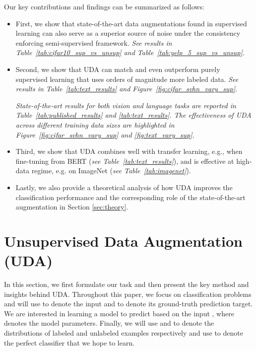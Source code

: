 \documentclass{article}
\def\name{UDA\xspace}
\begin{document}
Our key contributions and findings can be summarized as follows:
\begin{itemize}[leftmargin=*,itemsep=0em,topsep=0em]
    \item First, we show that state-of-the-art data augmentations found in supervised learning can also serve as a superior source of noise under the consistency enforcing semi-supervised framework. {\it See results in Table~\ref{tab:cifar10_sup_vs_unsup} and Table~\ref{tab:yelp_5_sup_vs_unsup}.}
    \item Second, we show that UDA can match and even outperform purely supervised learning that uses orders of magnitude more labeled data. {\it See results in Table~\ref{tab:text_results} and Figure~\ref{fig:cifar_svhn_vary_sup}.}
    
    {\it State-of-the-art results for both vision and language tasks are reported in Table~\ref{tab:published_results} and \ref{tab:text_results}. The effectiveness of UDA across different training data sizes are highlighted in Figure~\ref{fig:cifar_svhn_vary_sup} and \ref{fig:text_vary_sup}.}
    \item Third, we show that UDA combines well with transfer learning, e.g., when fine-tuning from BERT ({\it see Table~\ref{tab:text_results}}), and is effective at high-data regime, e.g. on ImageNet ({\it see Table~\ref{tab:imagenet}}).
    \item Lastly, we also provide a theoretical analysis of how \name improves the classification performance and the corresponding role of the state-of-the-art augmentation in Section \ref{sec:theory}.
\end{itemize}
 \vspace{-0.5em}
\section{Unsupervised Data Augmentation (UDA)}
\label{sec:method}
\vspace{-0.5em}
In this section, we first formulate our task and then present the key method and insights behind \name.
Throughout this paper, we focus on classification problems and will use  to denote the input and  to denote its ground-truth prediction target. We are interested in learning a model  to predict  based on the input , where  denotes the model parameters.
Finally, we will use  and  to denote the distributions of labeled and unlabeled examples respectively and use  to denote the perfect classifier that we hope to learn. 

\vspace{-0.5em}
\end{document}
